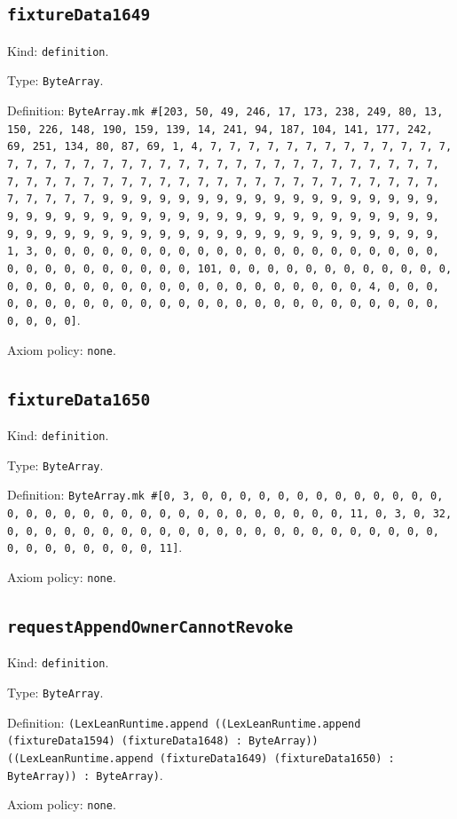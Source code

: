 \documentclass[11pt]{article}
\begin{document}
\subsection*{\texttt{fixtureData1649}}
\noindent Kind: \texttt{definition}.\par
\noindent Type: \texttt{ByteArray}.\par
\noindent Definition: \texttt{ByteArray.mk \#[203, 50, 49, 246, 17, 173, 238, 249, 80, 13, 150, 226, 148, 190, 159, 139, 14, 241, 94, 187, 104, 141, 177, 242, 69, 251, 134, 80, 87, 69, 1, 4, 7, 7, 7, 7, 7, 7, 7, 7, 7, 7, 7, 7, 7, 7, 7, 7, 7, 7, 7, 7, 7, 7, 7, 7, 7, 7, 7, 7, 7, 7, 7, 7, 7, 7, 7, 7, 7, 7, 7, 7, 7, 7, 7, 7, 7, 7, 7, 7, 7, 7, 7, 7, 7, 7, 7, 7, 7, 7, 7, 7, 7, 7, 7, 7, 9, 9, 9, 9, 9, 9, 9, 9, 9, 9, 9, 9, 9, 9, 9, 9, 9, 9, 9, 9, 9, 9, 9, 9, 9, 9, 9, 9, 9, 9, 9, 9, 9, 9, 9, 9, 9, 9, 9, 9, 9, 9, 9, 9, 9, 9, 9, 9, 9, 9, 9, 9, 9, 9, 9, 9, 9, 9, 9, 9, 9, 9, 9, 9, 1, 3, 0, 0, 0, 0, 0, 0, 0, 0, 0, 0, 0, 0, 0, 0, 0, 0, 0, 0, 0, 0, 0, 0, 0, 0, 0, 0, 0, 0, 0, 0, 0, 101, 0, 0, 0, 0, 0, 0, 0, 0, 0, 0, 0, 0, 0, 0, 0, 0, 0, 0, 0, 0, 0, 0, 0, 0, 0, 0, 0, 0, 0, 0, 0, 4, 0, 0, 0, 0, 0, 0, 0, 0, 0, 0, 0, 0, 0, 0, 0, 0, 0, 0, 0, 0, 0, 0, 0, 0, 0, 0, 0, 0, 0, 0]}.\par
\noindent Axiom policy: \texttt{none}.\par
\subsection*{\texttt{fixtureData1650}}
\noindent Kind: \texttt{definition}.\par
\noindent Type: \texttt{ByteArray}.\par
\noindent Definition: \texttt{ByteArray.mk \#[0, 3, 0, 0, 0, 0, 0, 0, 0, 0, 0, 0, 0, 0, 0, 0, 0, 0, 0, 0, 0, 0, 0, 0, 0, 0, 0, 0, 0, 0, 0, 0, 0, 11, 0, 3, 0, 32, 0, 0, 0, 0, 0, 0, 0, 0, 0, 0, 0, 0, 0, 0, 0, 0, 0, 0, 0, 0, 0, 0, 0, 0, 0, 0, 0, 0, 0, 0, 0, 11]}.\par
\noindent Axiom policy: \texttt{none}.\par
\subsection*{\texttt{requestAppendOwnerCannotRevoke}}
\noindent Kind: \texttt{definition}.\par
\noindent Type: \texttt{ByteArray}.\par
\noindent Definition: \texttt{(LexLeanRuntime.append ((LexLeanRuntime.append (fixtureData1594) (fixtureData1648) : ByteArray)) ((LexLeanRuntime.append (fixtureData1649) (fixtureData1650) : ByteArray)) : ByteArray)}.\par
\noindent Axiom policy: \texttt{none}.\par
\end{document}
